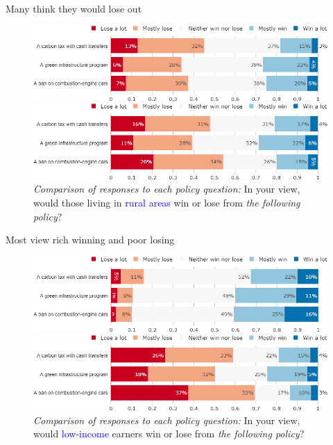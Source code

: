 \begin{framefont}{\small}
\begin{frame}{Many think they would lose out}%
\begin{figure}[h!]
\centering
\caption{\textit{Comparison of responses to each policy question:} Do you think that \textcolor{blue}{financially your household} would win or lose from \textit{the policy}?}
\includegraphics[width=.61\paperwidth]{../figures/FR/policies_win_lose_self_FR.png}
\vspace{-.1cm}
\centering
\caption{\textit{Comparison of responses to each policy question:} In your view, would those living in \textcolor{blue}{rural areas} win or lose from \textit{the following policy}?}
\includegraphics[width=.61\paperwidth]{../figures/FR/policies_win_lose_rural_FR.png}
\end{figure}
\end{frame}

\begin{frame}{Most view rich winning and poor losing}%
\begin{figure}[h!]
\centering
\caption{\textit{Comparison of responses to each policy question:} In your view, would \textcolor{blue}{high-income} earners win or lose from \textit{the following policy}?}
\includegraphics[width=.61\paperwidth]{../figures/FR/policies_win_lose_rich_FR.png}
\vspace{-.1cm}
\centering
\caption{\textit{Comparison of responses to each policy question:} In your view, would \textcolor{blue}{low-income} earners win or lose from \textit{the following policy}?}
\includegraphics[width=.61\paperwidth]{../figures/FR/policies_win_lose_poor_FR.png}
\end{figure}
\end{frame}


\end{framefont}

